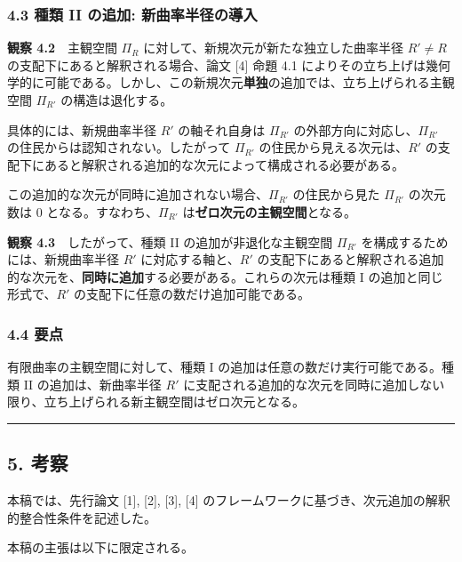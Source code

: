 \documentclass[a4paper,11pt]{ltjsarticle}
\theoremstyle{definition}
\begin{document}
\subsubsection{4.3 種類 II の追加: 新曲率半径の導入}\label{ux7a2eux985e-ii-ux306eux8ffdux52a0-ux65b0ux66f2ux7387ux534aux5f84ux306eux5c0eux5165}

\textbf{観察 4.2}　主観空間 \(\Pi_R\) に対して、新規次元が新たな独立した曲率半径 \(R' \neq R\) の支配下にあると解釈される場合、論文 {[}4{]} 命題 4.1 によりその立ち上げは幾何学的に可能である。しかし、この新規次元\textbf{単独}の追加では、立ち上げられる主観空間 \(\Pi_{R'}\) の構造は退化する。

具体的には、新規曲率半径 \(R'\) の軸それ自身は \(\Pi_{R'}\) の外部方向に対応し、\(\Pi_{R'}\) の住民からは認知されない。したがって \(\Pi_{R'}\) の住民から見える次元は、\(R'\) の支配下にあると解釈される追加的な次元によって構成される必要がある。

この追加的な次元が同時に追加されない場合、\(\Pi_{R'}\) の住民から見た \(\Pi_{R'}\) の次元数は \(0\) となる。すなわち、\(\Pi_{R'}\) は\textbf{ゼロ次元の主観空間}となる。

\textbf{観察 4.3}　したがって、種類 II の追加が非退化な主観空間 \(\Pi_{R'}\) を構成するためには、新規曲率半径 \(R'\) に対応する軸と、\(R'\) の支配下にあると解釈される追加的な次元を、\textbf{同時に追加}する必要がある。これらの次元は種類 I の追加と同じ形式で、\(R'\) の支配下に任意の数だけ追加可能である。

\subsubsection{4.4 要点}\label{ux8981ux70b9-1}

有限曲率の主観空間に対して、種類 I の追加は任意の数だけ実行可能である。種類 II の追加は、新曲率半径 \(R'\) に支配される追加的な次元を同時に追加しない限り、立ち上げられる新主観空間はゼロ次元となる。

\begin{center}\rule{0.5\linewidth}{0.5pt}\end{center}

\subsection{5. 考察}\label{ux8003ux5bdf}

本稿では、先行論文 {[}1{]}, {[}2{]}, {[}3{]}, {[}4{]} のフレームワークに基づき、次元追加の解釈的整合性条件を記述した。

本稿の主張は以下に限定される。
\end{document}
